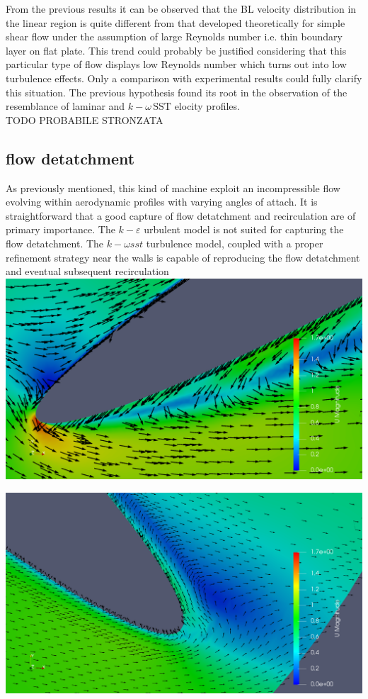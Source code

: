 \documentclass[a4paper,12pt]{article}
\newcommand{\todo}{\colorbox{cyan!60}{TODO}}
\newcommand{\kepsilon}[1]{$k\!-\!\varepsilon $ }
\newcommand{\komegasst}[1]{$k\!-\!\omega \, \text{SST} $ }
\begin{document}
From the previous results it can be observed that the BL velocity distribution in the linear region is quite different from that developed theoretically for simple shear flow under the assumption of large Reynolds number i.e. thin boundary layer on flat plate.
This trend could probably be justified considering that this particular type of flow displays low Reynolds number which turns out into low turbulence effects.
Only a comparison with experimental results could fully clarify this situation.
The previous hypothesis found its root in the observation of the resemblance of laminar and \komegasst velocity profiles.\\
\todo{} PROBABILE STRONZATA

\subsection{flow detatchment}

As previously mentioned, this kind of machine exploit an incompressible flow evolving within aerodynamic profiles with varying angles of attach.
It is straightforward that a good capture of flow detatchment and recirculation are of primary importance.
The \kepsilon turbulent model is not suited for capturing the flow detatchment.
The $k-\omega sst$ turbulence model, coupled with a proper refinement strategy near the walls is capable of reproducing the flow detatchment and eventual subsequent recirculation
\includegraphics[width=\textwidth]{images/turbulence/recirculation_scalarScaled.png}

\includegraphics[width=\textwidth]{images/turbulence/recirculation_scalarScaledGOODresolution.png}  
\end{document}
